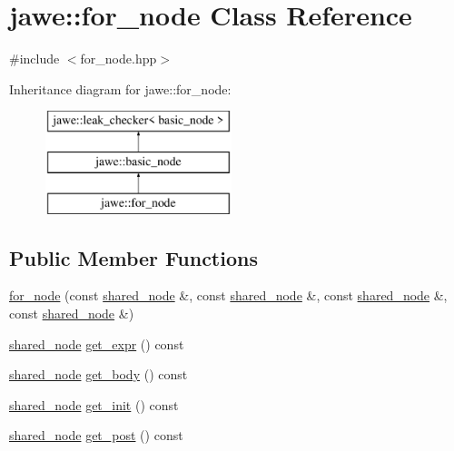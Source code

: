 \hypertarget{classjawe_1_1for__node}{}\section{jawe\+:\+:for\+\_\+node Class Reference}
\label{classjawe_1_1for__node}


{\ttfamily \#include $<$for\+\_\+node.\+hpp$>$}

Inheritance diagram for jawe\+:\+:for\+\_\+node\+:\begin{figure}[H]
\begin{center}
\leavevmode
\includegraphics[height=3.000000cm]{classjawe_1_1for__node}
\end{center}
\end{figure}
\subsection*{Public Member Functions}
\begin{DoxyCompactItemize}
\item 
\hyperlink{classjawe_1_1for__node_a720114bf0a3a54234f0440b28bee76ac}{for\+\_\+node} (const \hyperlink{namespacejawe_a3f307481d921b6cbb50cc8511fc2b544}{shared\+\_\+node} \&, const \hyperlink{namespacejawe_a3f307481d921b6cbb50cc8511fc2b544}{shared\+\_\+node} \&, const \hyperlink{namespacejawe_a3f307481d921b6cbb50cc8511fc2b544}{shared\+\_\+node} \&, const \hyperlink{namespacejawe_a3f307481d921b6cbb50cc8511fc2b544}{shared\+\_\+node} \&)
\item 
\hyperlink{namespacejawe_a3f307481d921b6cbb50cc8511fc2b544}{shared\+\_\+node} \hyperlink{classjawe_1_1for__node_a5717876344a01dc22d0601f082f014e4}{get\+\_\+expr} () const
\item 
\hyperlink{namespacejawe_a3f307481d921b6cbb50cc8511fc2b544}{shared\+\_\+node} \hyperlink{classjawe_1_1for__node_a486a5ec435ae87654f63dd2fdca55093}{get\+\_\+body} () const
\item 
\hyperlink{namespacejawe_a3f307481d921b6cbb50cc8511fc2b544}{shared\+\_\+node} \hyperlink{classjawe_1_1for__node_af47b420f615e83103dc1035a76324db6}{get\+\_\+init} () const
\item 
\hyperlink{namespacejawe_a3f307481d921b6cbb50cc8511fc2b544}{shared\+\_\+node} \hyperlink{classjawe_1_1for__node_abc377eab368d131f41e184642ee9942d}{get\+\_\+post} () const
\end{DoxyCompactItemize}
